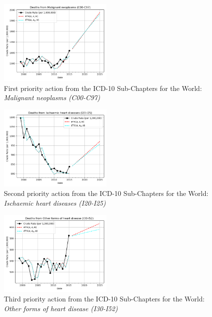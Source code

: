 \documentclass[10pt, a4paper, twocolumn]{IEEEconf}
\begin{document}
\begin{figure}[H]
  \centering
  \includegraphics[width=0.5\textwidth]{results/WORLD_ICD10_SUB_CHAPTERS/Malignant_neoplasms_C00-C97_ets.png}
  \caption{First priority action from the ICD-10 Sub-Chapters for the World: \textit{Malignant neoplasms (C00-C97)}}\label{fig:k11a}
\end{figure}

\begin{figure}[H]
  \centering
  \includegraphics[width=0.5\textwidth]{results/WORLD_ICD10_SUB_CHAPTERS/Ischaemic_heart_diseases_I20-I25_ets.png}
  \caption{Second priority action from the ICD-10 Sub-Chapters for the World: \textit{Ischaemic heart diseases (I20-I25)}}\label{fig:k11b}
\end{figure}

\begin{figure}[H]
  \centering
  \includegraphics[width=0.5\textwidth]{results/WORLD_ICD10_SUB_CHAPTERS/Other_forms_of_heart_disease_I30-I52_ets.png}
  \caption{Third priority action from the ICD-10 Sub-Chapters for the World: \textit{Other forms of heart disease (I30-I52)}}\label{fig:k11c}
\end{figure}
\end{document}
